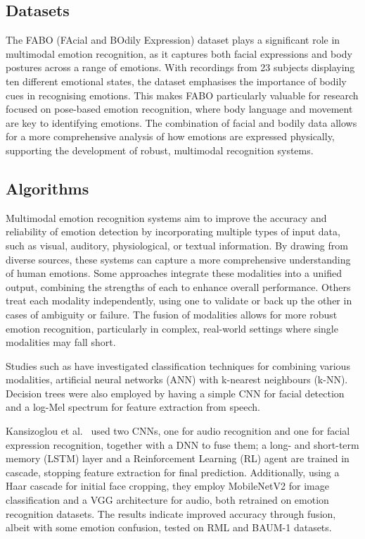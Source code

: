 \subsection{Datasets}

The FABO (FAcial and BOdily Expression) dataset \cite{1699093} plays a significant role in multimodal emotion recognition, as it captures both facial expressions and body postures across a range of emotions. With recordings from 23 subjects displaying ten different emotional states, the dataset emphasises the importance of bodily cues in recognising emotions. This makes FABO particularly valuable for research focused on pose-based emotion recognition, where body language and movement are key to identifying emotions. The combination of facial and bodily data allows for a more comprehensive analysis of how emotions are expressed physically, supporting the development of robust, multimodal recognition systems.

\subsection{Algorithms}

Multimodal emotion recognition systems aim to improve the accuracy and reliability of emotion detection by incorporating multiple types of input data, such as visual, auditory, physiological, or textual information. By drawing from diverse sources, these systems can capture a more comprehensive understanding of human emotions. Some approaches integrate these modalities into a unified output, combining the strengths of each to enhance overall performance. Others treat each modality independently, using one to validate or back up the other in cases of ambiguity or failure. The fusion of modalities allows for more robust emotion recognition, particularly in complex, real-world settings where single modalities may fall short.

Studies such as \cite{Song2018-vu} have investigated classification techniques for combining various modalities, artificial neural networks (ANN) with k-nearest neighbours (k-NN). Decision trees were also employed by \cite{Adiga2020-wv} having a simple CNN for facial detection and a log-Mel spectrum for feature extraction from speech.

Kansizoglou et al.\ \cite{Kansizoglou2022-ih} used two CNNs, one for audio recognition and one for facial expression recognition, together with a DNN to fuse them; a long- and short-term memory (LSTM) layer and a Reinforcement Learning (RL) agent are trained in cascade, stopping feature extraction for final prediction. Additionally, using a Haar cascade for initial face cropping, they employ MobileNetV2 for image classification and a VGG architecture for audio, both retrained on emotion recognition datasets. The results indicate improved accuracy through fusion, albeit with some emotion confusion, tested on RML and BAUM-1 datasets.

